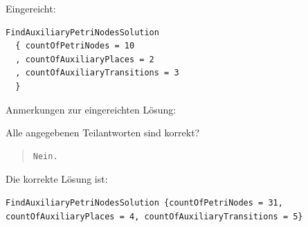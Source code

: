 Eingereicht:


\begin{verbatim}
FindAuxiliaryPetriNodesSolution 
  { countOfPetriNodes = 10
  , countOfAuxiliaryPlaces = 2
  , countOfAuxiliaryTransitions = 3 
  }
\end{verbatim}


Anmerkungen zur eingereichten Lösung:

Alle angegebenen Teilantworten sind korrekt?

\begin{quote}
\begin{verbatim}
Nein.
\end{verbatim}
\end{quote}

Die korrekte Lösung ist:
\begin{verbatim}
FindAuxiliaryPetriNodesSolution {countOfPetriNodes = 31, countOfAuxiliaryPlaces = 4, countOfAuxiliaryTransitions = 5}
\end{verbatim}


